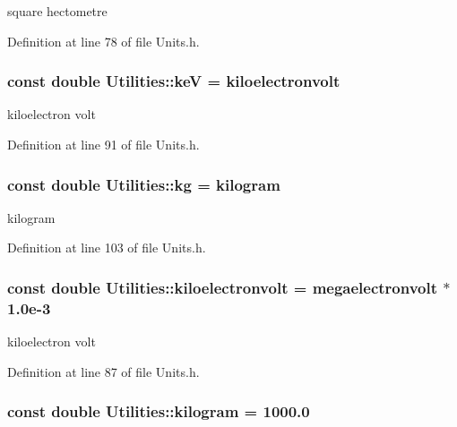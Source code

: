 square hectometre 



Definition at line 78 of file Units.h.

\hypertarget{namespace_utilities_a767ae2d5cc9d3f6e952a73c396d6a76b}{
\subsubsection[{keV}]{\setlength{\rightskip}{0pt plus 5cm}const double {\bf Utilities::keV} = {\bf kiloelectronvolt}}}
\label{namespace_utilities_a767ae2d5cc9d3f6e952a73c396d6a76b}


kiloelectron volt 



Definition at line 91 of file Units.h.

\hypertarget{namespace_utilities_ade5640692129a688db6afa41d15d8778}{
\subsubsection[{kg}]{\setlength{\rightskip}{0pt plus 5cm}const double {\bf Utilities::kg} = {\bf kilogram}}}
\label{namespace_utilities_ade5640692129a688db6afa41d15d8778}


kilogram 



Definition at line 103 of file Units.h.

\hypertarget{namespace_utilities_adf9960a6afad6c0ee02c6a8104fe0bac}{
\subsubsection[{kiloelectronvolt}]{\setlength{\rightskip}{0pt plus 5cm}const double {\bf Utilities::kiloelectronvolt} = {\bf megaelectronvolt} $\ast$ 1.0e-\/3}}
\label{namespace_utilities_adf9960a6afad6c0ee02c6a8104fe0bac}


kiloelectron volt 



Definition at line 87 of file Units.h.

\hypertarget{namespace_utilities_a53892b9a331b44b7edb02383d2d3cc74}{
\subsubsection[{kilogram}]{\setlength{\rightskip}{0pt plus 5cm}const double {\bf Utilities::kilogram} = 1000.0}}
\label{namespace_utilities_a53892b9a331b44b7edb02383d2d3cc74}


